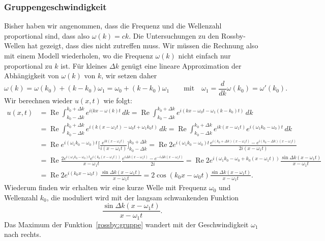 \subsubsection{Gruppengeschwindigkeit}
%
Bisher haben wir angenommen, dass die Frequenz und die Wellenzahl proportional
sind, dass also $\omega(k)=ck$.
Die Untersuchungen zu den Rossby-Wellen hat gezeigt, dass dies nicht
zutreffen muss.
Wir müssen die Rechnung also mit einem Modell wiederholen, wo die
Frequenz $\omega(k)$ nicht einfach nur proportional zu $k$ ist.
Für kleines $\Delta k$ genügt eine lineare Approximation der
Abhängigkeit von $\omega(k)$ von $k$, wir setzen daher
\begin{equation}
\omega(k)
=
\omega(k_0) + (k-k_0)\omega_1
=
\omega_0 + (k-k_0)\omega_1
\qquad
\text{mit}
\quad
\omega_1 = \frac{d}{dk}\omega(k_0) = \omega'(k_0).
\end{equation}
Wir berechnen wieder $u(x,t)$ wie folgt:
\begin{align*}
u(x,t)
&=
\operatorname{Re}
\int_{k_0-\Delta k}^{k_0+\Delta k}
e^{i(kx-\omega(k)t}\,dk
=
\operatorname{Re}
\int_{k_0-\Delta k}^{k_0+\Delta k}
e^{i(kx-\omega_0t -\omega_1(k-k_0)t)}
\,dk
\\
&=
\operatorname{Re}
\int_{k_0-\Delta k}^{k_0+\Delta k}
e^{i(k(x-\omega_1 t)-\omega_0t +\omega_1k_0t)}
\,dk
=
\operatorname{Re}
\int_{k_0-\Delta k}^{k_0+\Delta k}
e^{ik(x-\omega_1 t)}
e^{i(\omega_1k_0-\omega_0)t}
\,dk
\\
&=
\operatorname{Re}
e^{i(\omega_1k_0-\omega_0)t}
\biggl[
\frac{e^{ik(x-\omega_1 t)}}{i(x-\omega_1 t)}
\biggr]_{k_0-\Delta k}^{k_0+\Delta k}
=
\operatorname{Re}
2e^{i(\omega_1k_0-\omega_0)t}
\frac{
e^{i(k_0+\Delta k)(x-\omega_1 t)}
-
e^{i(k_0-\Delta k)(x-\omega_1 t)}
}{2i(x-\omega_1 t)}
\\
&=
\operatorname{Re}
\frac{2e^{i(\omega_1k_0-\omega_0)t}e^{i(k_0(x-\omega_1 t))}}{x-\omega_1 t}
\frac{
e^{i\Delta k(x-\omega_1 t)}
-
e^{-i\Delta k(x-\omega_1 t)}
}{2i}
=
\operatorname{Re}
2e^{i(\omega_1k_0-\omega_0+k_0(x-\omega_1 t))}
\frac{\sin \Delta k(x-\omega_1t)}{x-\omega_1 t}
\\
&=
\operatorname{Re}
2e^{i(k_0x-\omega_0t)}\,
\frac{\sin \Delta k(x-\omega_1t)}{x-\omega_1 t}
=
2\cos(k_0x-\omega_0t)
\frac{\sin \Delta k(x-\omega_1t)}{x-\omega_1 t}.
\end{align*}
Wiederum finden wir erhalten wir eine kurze Welle mit Frequenz
$\omega_0$ und Wellenzahl $k_0$, die moduliert wird mit der langsam
schwankenden Funktion
\begin{equation}
\frac{\sin\Delta k(x-\omega_1t)}{x-\omega_1 t}.
\label{rossby:gruppe}
\end{equation}
Das Maximum der Funktion~\eqref{rossby:gruppe} wandert mit der
Geschwindigkeit $\omega_1$ nach rechts.

